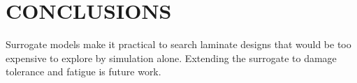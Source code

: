 \chapter{CONCLUSIONS}
\label{ch:conclusion}

Surrogate models make it practical to search laminate designs that would be too expensive to
explore by simulation alone. Extending the surrogate to damage tolerance and fatigue is future
work.
